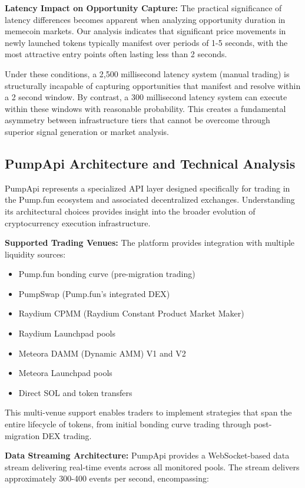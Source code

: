 \documentclass[12pt,a4paper]{article}
\begin{document}
\textbf{Latency Impact on Opportunity Capture:} The practical significance of latency differences becomes apparent when analyzing opportunity duration in memecoin markets. Our analysis indicates that significant price movements in newly launched tokens typically manifest over periods of 1-5 seconds, with the most attractive entry points often lasting less than 2 seconds.

Under these conditions, a 2,500 millisecond latency system (manual trading) is structurally incapable of capturing opportunities that manifest and resolve within a 2 second window. By contrast, a 300 millisecond latency system can execute within these windows with reasonable probability. This creates a fundamental asymmetry between infrastructure tiers that cannot be overcome through superior signal generation or market analysis.

\subsection{PumpApi Architecture and Technical Analysis}

PumpApi represents a specialized API layer designed specifically for trading in the Pump.fun ecosystem and associated decentralized exchanges. Understanding its architectural choices provides insight into the broader evolution of cryptocurrency execution infrastructure.

\textbf{Supported Trading Venues:} The platform provides integration with multiple liquidity sources:

\begin{itemize}
\item Pump.fun bonding curve (pre-migration trading)
\item PumpSwap (Pump.fun's integrated DEX)
\item Raydium CPMM (Raydium Constant Product Market Maker)
\item Raydium Launchpad pools
\item Meteora DAMM (Dynamic AMM) V1 and V2
\item Meteora Launchpad pools
\item Direct SOL and token transfers
\end{itemize}

This multi-venue support enables traders to implement strategies that span the entire lifecycle of tokens, from initial bonding curve trading through post-migration DEX trading.

\textbf{Data Streaming Architecture:} PumpApi provides a WebSocket-based data stream delivering real-time events across all monitored pools. The stream delivers approximately 300-400 events per second, encompassing:
\end{document}
